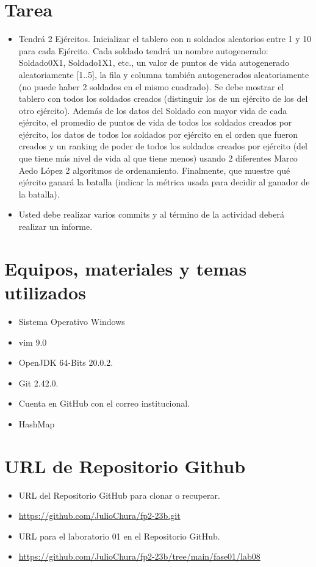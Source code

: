 \documentclass{article}
\begin{document}
	\section{Tarea}
	\begin{itemize}		
		\item 
		Tendrá 2 Ejércitos. Inicializar el tablero con n soldados aleatorios entre 1 y 10 para cada 
		Ejército. Cada soldado tendrá un nombre autogenerado: Soldado0X1, Soldado1X1, etc., un 
		valor de puntos de vida autogenerado aleatoriamente [1..5], la fila y columna también 
		autogenerados aleatoriamente (no puede haber 2 soldados en el mismo cuadrado). Se debe 
		mostrar el tablero con todos los soldados creados (distinguir los de un ejército de los del otro 
		ejército). Además de los datos del Soldado con mayor vida de cada ejército, el promedio de 
		puntos de vida de todos los soldados creados por ejército, los datos de todos los soldados por 
		ejército en el orden que fueron creados y un ranking de poder de todos los soldados creados
		por ejército (del que tiene más nivel de vida al que tiene menos) usando 2 diferentes 
		Marco Aedo López 2
		algoritmos de ordenamiento. Finalmente, que muestre qué ejército ganará la batalla (indicar 
		la métrica usada para decidir al ganador de la batalla).
		\item Usted debe realizar varios commits y al término de la actividad deberá realizar un informe.
		
	\end{itemize}
	
	\section{Equipos, materiales y temas utilizados}
	\begin{itemize}
		\item Sistema Operativo Windows
		\item vim 9.0
		\item OpenJDK 64-Bits 20.0.2.
		\item Git 2.42.0.
		\item Cuenta en GitHub con el correo institucional.
		\item HashMap
	\end{itemize}
	
	\section{URL de Repositorio Github}
	\begin{itemize}
		\item URL del Repositorio GitHub para clonar o recuperar.
		\item \url{https://github.com/JulioChura/fp2-23b.git}
		\item URL para el laboratorio 01 en el Repositorio GitHub.
		\item \url{https://github.com/JulioChura/fp2-23b/tree/main/fase01/lab08}
	\end{itemize}
	
\end{document}
